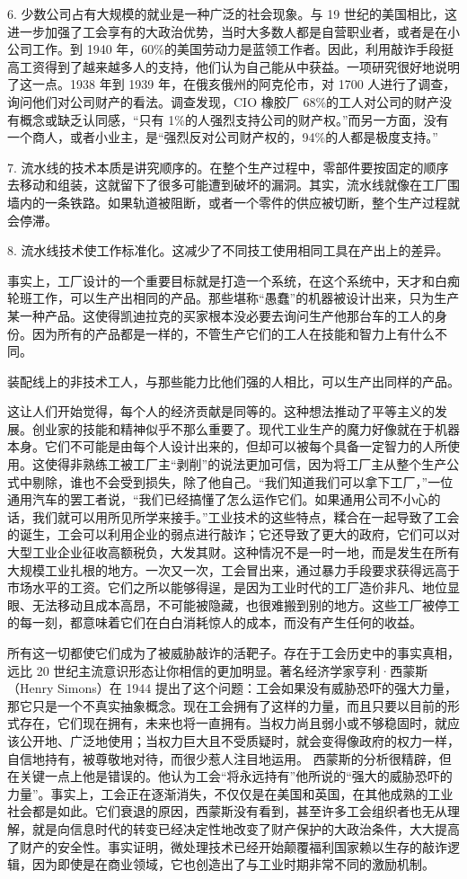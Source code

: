 6. 少数公司占有大规模的就业是一种广泛的社会现象。与 19 世纪的美国相比，这进一步加强了工会享有的大政治优势，当时大多数人都是自营职业者，或者是在小公司工作。到 1940 年，60\%的美国劳动力是蓝领工作者。因此，利用敲诈手段挺高工资得到了越来越多人的支持，他们认为自己能从中获益。一项研究很好地说明了这一点。1938 年到 1939 年，在俄亥俄州的阿克伦市，对 1700 人进行了调查，询问他们对公司财产的看法。调查发现，CIO 橡胶厂 68\%的工人对公司的财产没有概念或缺乏认同感，“只有 1\%的人强烈支持公司的财产权。”而另一方面，没有一个商人，或者小业主，是“强烈反对公司财产权的，94\%的人都是极度支持。”

7. 流水线的技术本质是讲究顺序的。在整个生产过程中，零部件要按固定的顺序去移动和组装，这就留下了很多可能遭到破坏的漏洞。其实，流水线就像在工厂围墙内的一条铁路。如果轨道被阻断，或者一个零件的供应被切断，整个生产过程就会停滞。

8. 流水线技术使工作标准化。这减少了不同技工使用相同工具在产出上的差异。

事实上，工厂设计的一个重要目标就是打造一个系统，在这个系统中，天才和白痴轮班工作，可以生产出相同的产品。那些堪称“愚蠢”的机器被设计出来，只为生产某一种产品。这使得凯迪拉克的买家根本没必要去询问生产他那台车的工人的身份。因为所有的产品都是一样的，不管生产它们的工人在技能和智力上有什么不同。

装配线上的非技术工人，与那些能力比他们强的人相比，可以生产出同样的产品。


这让人们开始觉得，每个人的经济贡献是同等的。这种想法推动了平等主义的发展。创业家的技能和精神似乎不那么重要了。现代工业生产的魔力好像就在于机器本身。它们不可能是由每个人设计出来的，但却可以被每个具备一定智力的人所使用。这使得非熟练工被工厂主“剥削”的说法更加可信，因为将工厂主从整个生产公式中剔除，谁也不会受到损失，除了他自己。“我们知道我们可以拿下工厂，”一位通用汽车的罢工者说，“我们已经搞懂了怎么运作它们。如果通用公司不小心的话，我们就可以用所见所学来接手。”工业技术的这些特点，糅合在一起导致了工会的诞生，工会可以利用企业的弱点进行敲诈；它还导致了更大的政府，它们可以对大型工业企业征收高额税负，大发其财。这种情况不是一时一地，而是发生在所有大规模工业扎根的地方。一次又一次，工会冒出来，通过暴力手段要求获得远高于市场水平的工资。它们之所以能够得逞，是因为工业时代的工厂造价非凡、地位显眼、无法移动且成本高昂，不可能被隐藏，也很难搬到别的地方。这些工厂被停工的每一刻，都意味着它们在白白消耗惊人的成本，而没有产生任何的收益。

所有这一切都使它们成为了被威胁敲诈的活靶子。存在于工会历史中的事实真相，远比 20 世纪主流意识形态让你相信的更加明显。著名经济学家亨利·西蒙斯（Henry Simons）在 1944 提出了这个问题：工会如果没有威胁恐吓的强大力量，那它只是一个不真实抽象概念。现在工会拥有了这样的力量，而且只要以目前的形式存在，它们现在拥有，未来也将一直拥有。当权力尚且弱小或不够稳固时，就应该公开地、广泛地使用；当权力巨大且不受质疑时，就会变得像政府的权力一样，自信地持有，被尊敬地对待，而很少惹人注目地运用。 西蒙斯的分析很精辟，但在关键一点上他是错误的。他认为工会“将永远持有”他所说的“强大的威胁恐吓的力量”。事实上，工会正在逐渐消失，不仅仅是在美国和英国，在其他成熟的工业社会都是如此。它们衰退的原因，西蒙斯没有看到，甚至许多工会组织者也无从理解，就是向信息时代的转变已经决定性地改变了财产保护的大政治条件，大大提高了财产的安全性。事实证明，微处理技术已经开始颠覆福利国家赖以生存的敲诈逻辑，因为即使是在商业领域，它也创造出了与工业时期非常不同的激励机制。

